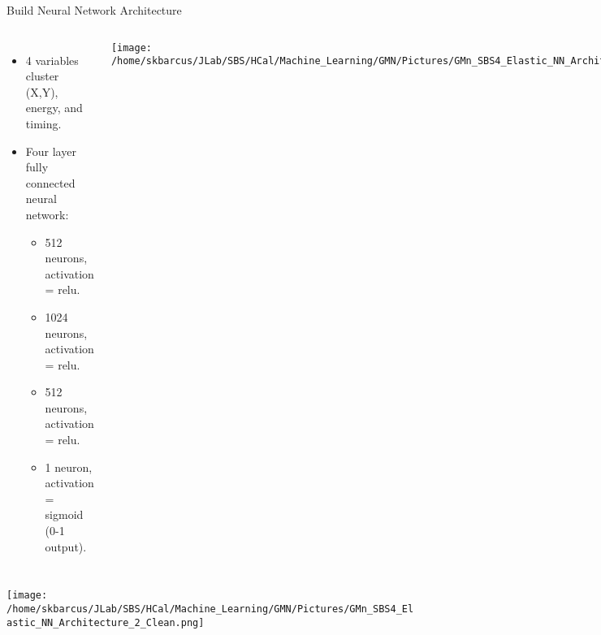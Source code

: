 \documentclass[10pt]{beamer}
\begin{document}
\begin{frame}{Build Neural Network Architecture}

\begin{columns}[T,onlytextwidth]
  	
  	\begin{itemize}
  		\item 4 variables cluster (X,Y), energy, and timing.
  		\item \alert{Four layer fully connected neural network:}
  		\begin{itemize}
  			\item[--] 512 neurons, activation = relu.
  			\item[--] 1024 neurons, activation = relu.
  			\item[--] 512 neurons, activation = relu.
  			\item[--] 1 neuron, activation = sigmoid (0-1 output).
  		\end{itemize}
  	\end{itemize}

    \begin{center}
    		\texttt{[image: /home/skbarcus/JLab/SBS/HCal/Machine\_Learning/GMN/Pictures/GMn\_SBS4\_Elastic\_NN\_Architecture\_1\_Clean.png]}
    	\end{center}
    		
    	\end{columns}	
    		
    	\begin{center}
        \texttt{[image: /home/skbarcus/JLab/SBS/HCal/Machine\_Learning/GMN/Pictures/GMn\_SBS4\_Elastic\_NN\_Architecture\_2\_Clean.png]}
	\end{center}
	
\end{frame}
\end{document}
